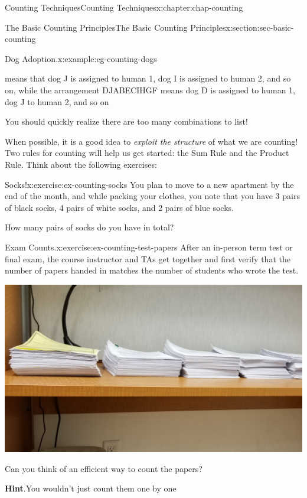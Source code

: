 \documentclass[oneside,10pt,]{book}
\newcommand{\blocktitlefont}{\relax}
\numberwithin{equation}{section}
\begin{document}
\begin{chapterptx}{Counting Techniques}{}{Counting Techniques}{}{}{x:chapter:chap-counting}
\begin{sectionptx}{The Basic Counting Principles}{}{The Basic Counting Principles}{}{}{x:section:sec-basic-counting}
\begin{example}{Dog Adoption.}{x:example:eg-counting-dogs}
\par
means that dog J is assigned to human 1, dog I is assigned to human 2, and so on, while the arrangement DJABECIHGF means dog D is assigned to human 1, dog J to human 2, and so on\textellipsis{}%
\par
You should quickly realize there are too many combinations to list!%
\end{example}
When possible, it is a good idea to \emph{exploit the structure} of what we are counting! Two rules for counting will help us get started: the Sum Rule and the Product Rule. Think about the following exercises:%
\begin{inlineexercise}{Socks!}{x:exercise:ex-counting-socks}%
You plan to move to a new apartment by the end of the month, and while packing your clothes, you note that you have 3 pairs of black socks, 4 pairs of white socks, and 2 pairs of blue socks.%
\par
How many pairs of socks do you have in total?%
\end{inlineexercise}
\begin{inlineexercise}{Exam Counts.}{x:exercise:ex-counting-test-papers}%
After an in-person term test or final exam, the course instructor and TAs get together and first verify that the number of papers handed in matches the number of students who wrote the test.%
\begin{sidebyside}{1}{0.25}{0.25}{0}%
\begin{sbspanel}{0.5}%
\includegraphics[width=\linewidth]{figs/test-papers.jpg}
\end{sbspanel}%
\end{sidebyside}%
\par
Can you think of an efficient way to count the papers?%
\par\smallskip%
\noindent\textbf{\blocktitlefont Hint}.\hypertarget{g:hint:id464493}{}\quad{}You wouldn't just count them one by one\textellipsis{}%

\end{inlineexercise}
\end{sectionptx}
\end{chapterptx}
\end{document}
